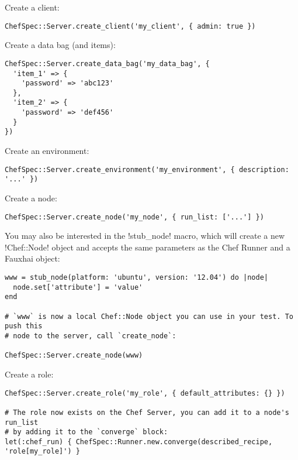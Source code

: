 Create a client:

\begin{lstlisting}[label=lst:testing-chef-zero6]
ChefSpec::Server.create_client('my_client', { admin: true })
\end{lstlisting}

Create a data bag (and items):

\begin{lstlisting}[label=lst:testing-chef-zero7]
ChefSpec::Server.create_data_bag('my_data_bag', {
  'item_1' => {
    'password' => 'abc123'
  },
  'item_2' => {
    'password' => 'def456'
  }
})
\end{lstlisting}

Create an environment:

\begin{lstlisting}[label=lst:testing-chef-zero8]
ChefSpec::Server.create_environment('my_environment', { description: '...' })
\end{lstlisting}

Create a node:

\begin{lstlisting}[label=lst:testing-chef-zero9]
ChefSpec::Server.create_node('my_node', { run_list: ['...'] })
\end{lstlisting}

You may also be interested in the \inline!stub_node! macro, which will create a new \inline!Chef::Node! object and accepts the same parameters as the Chef Runner and a Fauxhai object:

\begin{lstlisting}[label=lst:testing-chef-zero10]
www = stub_node(platform: 'ubuntu', version: '12.04') do |node|
  node.set['attribute'] = 'value'
end

# `www` is now a local Chef::Node object you can use in your test. To push this
# node to the server, call `create_node`:

ChefSpec::Server.create_node(www)
\end{lstlisting}

Create a role:

\begin{lstlisting}[label=lst:testing-chef-zero11]
ChefSpec::Server.create_role('my_role', { default_attributes: {} })

# The role now exists on the Chef Server, you can add it to a node's run_list
# by adding it to the `converge` block:
let(:chef_run) { ChefSpec::Runner.new.converge(described_recipe, 'role[my_role]') }
\end{lstlisting}

